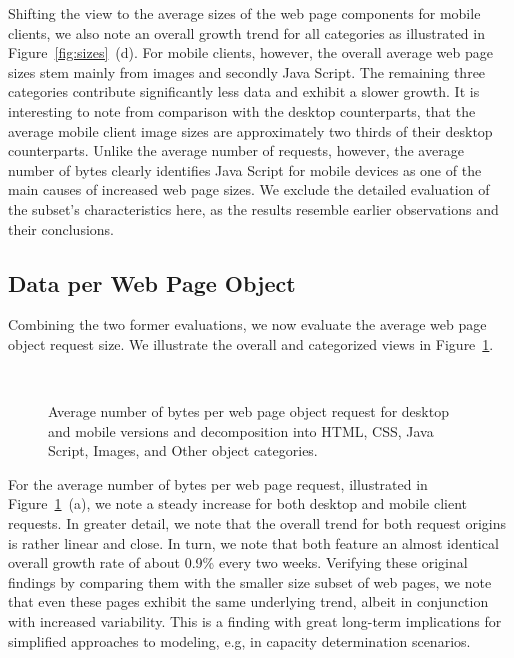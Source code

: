 Shifting the view to the average sizes of the web page components for mobile clients, we also note an overall growth trend for all categories as illustrated in Figure~\ref{fig:sizes}~(d).
For mobile clients, however, the overall average web page sizes stem mainly from images and secondly Java Script. 
The remaining three categories contribute significantly less data and exhibit a slower growth.
It is interesting to note from comparison with the desktop counterparts, that the average mobile client image sizes are approximately two thirds of their desktop counterparts.
Unlike the average number of requests, however, the average number of bytes clearly identifies Java Script for mobile devices as one of the main causes of increased web page sizes. 
We exclude the detailed evaluation of the subset's characteristics here, as the results resemble earlier observations and their conclusions.


\subsection*{Data per Web Page Object}
Combining the two former evaluations, we now evaluate the average web page object request size.
We illustrate the overall and categorized views in Figure~\ref{fig:relative}.
\begin{figure}[]
	\centering
	\\
	\qquad
	\caption{Average number of bytes per web page object request for desktop and mobile versions and decomposition into  HTML, CSS, Java Script, Images, and Other object categories.\label{fig:relative}}
\end{figure}
For the average number of bytes per web page request, illustrated in Figure~\ref{fig:relative}~(a), we note a steady increase for both desktop and mobile client requests. 
In greater detail, we note that the overall trend for both request origins is rather linear and close.
In turn, we note that both feature an almost identical overall growth rate of about 0.9\% every two weeks.
Verifying these original findings by comparing them with the smaller size subset of web pages, we note that even these pages exhibit the same underlying trend, albeit in conjunction with increased variability.
This is a finding with great long-term implications for simplified approaches to modeling, e.g, in capacity determination scenarios.

